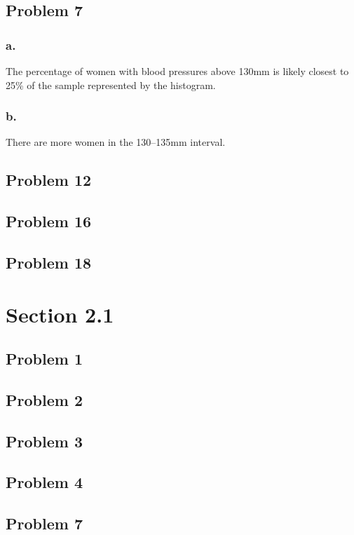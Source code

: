 \documentclass[11pt]{article}
\begin{document}
\subsection*{Problem 7}
\subsubsection*{a.}
The percentage of women with blood pressures above 130mm is likely closest to
25\% of the sample represented by the histogram. 

\subsubsection*{b.}
There are more women in the 130--135mm interval.

\subsection*{Problem 12}

\subsection*{Problem 16}

\subsection*{Problem 18}

\section*{Section 2.1}
\subsection*{Problem 1}

\subsection*{Problem 2}

\subsection*{Problem 3}

\subsection*{Problem 4}

\subsection*{Problem 7}
\end{document}
